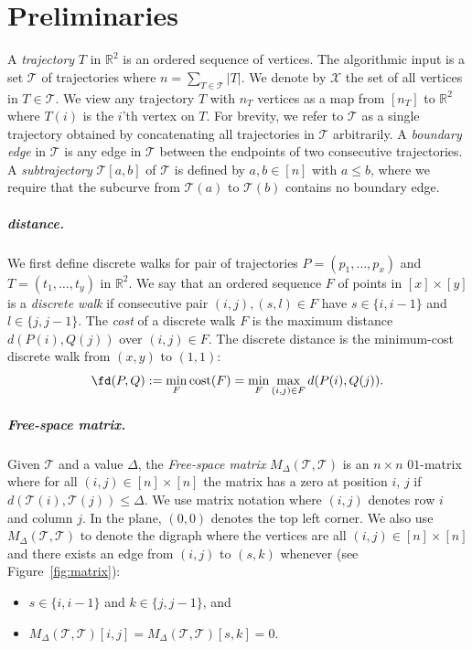 \section{Preliminaries}
%
A \emph{trajectory} $T$ in $\mathbb{R}^2$ is an ordered sequence of vertices.  
The algorithmic input is a set $\mathcal{T}$ of trajectories where $n = \sum_{T \in \mathcal{T}} |T|$. 
We denote by $\mathcal{X}$ the set of all vertices in $T \in \mathcal{T}$. 
We view any trajectory $T$ with $n_T$ vertices as a map from $[n_T]$ to $\mathbb{R}^2$ where $T(i)$ is the $i$'th vertex on $T$. 
For brevity, we refer to $\mathcal{T}$ as a single trajectory obtained by concatenating all trajectories in $\mathcal{T}$ arbitrarily.
 A \emph{boundary edge} in $\mathcal{T}$ is any edge in $\mathcal{T}$ between the endpoints of two consecutive trajectories.
A \emph{subtrajectory} $\mathcal{T}[a, b]$ of $\mathcal{T}$ is defined by $a, b \in [n]$ with $a \leq b$, where we require that the subcurve from $\mathcal{T}(a)$ to $\mathcal{T}(b)$ contains no boundary edge. 
%
%
%
\subparagraph{\frechet distance.}
We first define discrete walks for pair of trajectories $P = (p_1, \ldots, p_x)$ and $T = (t_1, \ldots, t_y)$ in $\mathbb{R}^2$.
We say that an ordered sequence $F$ of points in $[x] \times [y]$ is a \emph{discrete walk} if consecutive pair $(i, j), (s, l) \in F$ have $s\in \{i,i-1\}$ and $l\in\{j,j-1\}$.
The \emph{cost} of a discrete walk $F$ is the maximum distance $d(P(i), Q(j))$ over $(i, j) \in F$.
The discrete \frechet distance is the minimum-cost discrete walk from $(x, y)$ to $(1, 1)$:
\[
\fd(P, Q) := \min_{F }  \textnormal{cost}(F) = \min_{F } \max_{(i, j) \in F} d(P(i), Q(j)).
\]
%
\subparagraph{Free-space matrix.}
Given $\mathcal{T}$ and  a value $\Delta$, the \emph{Free-space matrix} $M_\Delta(\mathcal{T}, \mathcal{T})$ is an $n \times n$ $01$-matrix where for all $(i, j) \in [n] \times [n]$ the matrix has a zero at position $i$, $j$ if $d(\mathcal{T}(i), \mathcal{T}(j)) \leq \Delta$.  We use matrix notation where $(i, j)$ denotes row $i$ and column $j$.
In the plane, $(0, 0)$ denotes the top left corner.
We also use $M_\Delta(\mathcal{T}, \mathcal{T})$ to denote the digraph where the vertices are all $(i, j) \in [n] \times [n]$ and there exists an edge from $(i, j)$ to $(s, k)$ whenever (see Figure~\ref{fig:matrix}):
\begin{itemize}
    \item $s \in \{ i, i -1 \}$ and $k \in \{ j, j - 1 \}$, and
    \item  $M_\Delta(\mathcal{T}, \mathcal{T})[i, j] = M_\Delta(\mathcal{T}, \mathcal{T})[s, k] = 0$.
\end{itemize}
